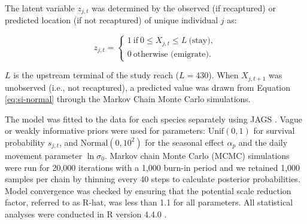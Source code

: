 \documentclass[11pt, class=article, crop=false]{standalone}
\begin{document}
The latent variable $z_{j,t}$ was determined by the observed (if recaptured) or predicted location (if not recaptured) of unique individual $j$ as: 

\begin{equation}
    z_{j,t} =
    \begin{cases}
        1~\text{if}~0 \le X_{j,t} \le L~\text{(stay)},\\
        0~\text{otherwise (emigrate)}.
    \end{cases}
\end{equation}

$L$ is the upstream terminal of the study reach ($L = 430$).
When $X_{j, t+1}$ was unobserved (i.e., not recaptured), a predicted value was drawn from Equation \ref{eq:si-normal} through the Markov Chain Monte Carlo simulations.






The model was fitted to the data for each species separately using JAGS \citep{JAGSJustAnother}. Vague or weakly informative priors were used for parameters: $\text{Unif}(0, 1)$ for survival probability $s_{j,t}$, and $\text{Normal}(0, 10^2)$ for the seasonal effect $\alpha_p$ and the daily movement parameter $\ln \sigma_0$. Markov chain Monte Carlo (MCMC) simulations were run for 20,000 iterations with a 1,000 burn-in period and we retained 1,000 samples per chain by thinning every 40 steps to calculate posterior probabilities. Model convergence was checked by ensuring that the potential scale reduction factor, referred to as R-hat, was less than 1.1 for all parameters. All statistical analyses were conducted in R version 4.4.0 \citep{CoreTeam2020}. 
\end{document}
